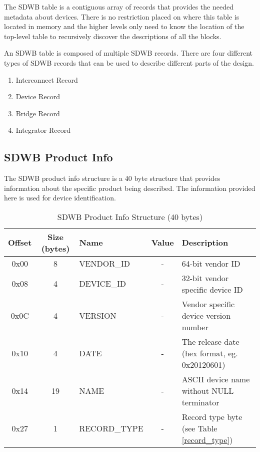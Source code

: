 \documentclass[a4paper, 12pt]{article}
\begin{document}
The SDWB table is a contiguous array of records that provides the needed metadata
about devices. There is no restriction placed on where this table is located in
memory and the higher levels only need to know the location of the top-level table
to recursively discover the descriptions of all the blocks.

An SDWB table is composed of multiple SDWB records. There are four different types of
SDWB records that can be used to describe different parts of the design.

\begin{enumerate}
\item Interconnect Record
\item Device Record
\item Bridge Record
\item Integrator Record
\end{enumerate}

\subsection{SDWB Product Info}

The SDWB product info structure is a 40 byte structure that provides information about
the specific product being described. The information provided here is used for device
identification.

\begin{center}
  \begin{savenotes}
    \begin{table}[!ht]\footnotesize
      \caption{SDWB Product Info Structure (40 bytes)}\label{sdwb_product_struct}\centering
        \begin{tabular}{| c | c | l | c | p{5cm} |} \hline
        Offset & Size (bytes) & Name & Value & Description \\ \hline
        0x00 & 8 & VENDOR\_ID & - & 64-bit vendor ID \\ \hline
        0x08 & 4 & DEVICE\_ID & - & 32-bit vendor specific device ID \\ \hline
        0x0C & 4 & VERSION & - & Vendor specific device version number \\ \hline
        0x10 & 4 & DATE & - & The release date (hex format, eg. 0x20120601) \\ \hline
        0x14 & 19 & NAME & - & ASCII device name without NULL terminator \\ \hline
        0x27 & 1 & RECORD\_TYPE & - & Record type byte (see Table \ref{record_type}) \\ \hline
        \end{tabular}
    \end{table}
  \end{savenotes}
\end{center}
\end{document}
